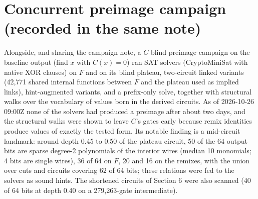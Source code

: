 \documentclass[11pt,a4paper]{article}
\begin{document}
\section{Concurrent preimage campaign (recorded in the same note)}
Alongside, and sharing the campaign note, a $C$-blind preimage campaign on the baseline output (find $x$ with $C(x)=0$) ran SAT solvers (CryptoMiniSat with native XOR clauses) on $F$ and on its blind plateau, two-circuit linked variants (42{,}771 shared internal functions between $F$ and the plateau used as implied links), hint-augmented variants, and a prefix-only solve, together with structural walks over the vocabulary of values born in the derived circuits. As of 2026-10-26 09:00Z none of the solvers had produced a preimage after about two days, and the structural walks were shown to leave $C$'s gates early because remix identities produce values of exactly the tested form. Its notable finding is a mid-circuit landmark: around depth 0.45 to 0.50 of the plateau circuit, 50 of the 64 output bits are sparse degree-2 polynomials of the interior wires (median 10 monomials; 4 bits are single wires), 36 of 64 on $F$, 20 and 16 on the remixes, with the union over cuts and circuits covering 62 of 64 bits; these relations were fed to the solvers as sound hints. The shortened circuits of Section 6 were also scanned (40 of 64 bits at depth 0.40 on a 279{,}263-gate intermediate).
\end{document}
